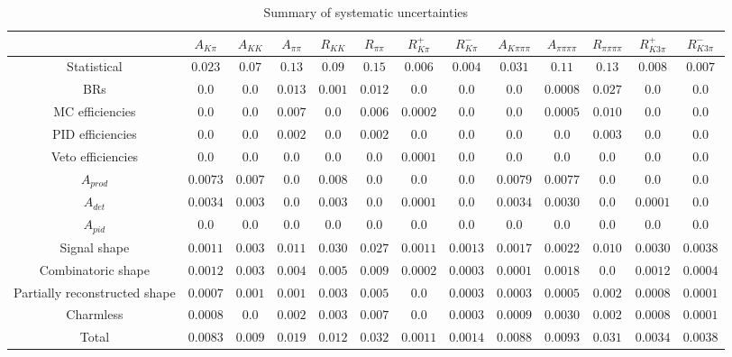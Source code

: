 \begin{table}
\centering
{\footnotesize
\begin{tabular}{ccccccccccccc}
\hline
& $A_{K\pi}$ & $A_{KK}$ & $A_{\pi\pi}$ & $R_{KK}$ & $R_{\pi\pi}$ & $R^+_{K\pi}$ & $R^-_{K\pi}$ & $A_{K\pi\pi\pi}$ & $A_{\pi\pi\pi\pi}$ & $R_{\pi\pi\pi\pi}$ & $R^+_{K3\pi}$ & $R^-_{K3\pi}$ \\
\hline
Statistical & $0.023$ & $0.07$ & $0.13$ & $0.09$ & $0.15$ & $0.006$ & $0.004$ & $0.031$ & $0.11$ & $0.13$ & $0.008$ & $0.007$ \\
\hline
BRs  & $0.0$ & $0.0$ & $0.013$ & $0.001$ & $0.012$ & $0.0$ & $0.0$ & $0.0$ & $0.0008$ & $0.027$ & $0.0$ & $0.0$ \\
MC efficiencies  & $0.0$ & $0.0$ & $0.007$ & $0.0$ & $0.006$ & $0.0002$ & $0.0$ & $0.0$ & $0.0005$ & $0.010$ & $0.0$ & $0.0$ \\
PID efficiencies  & $0.0$ & $0.0$ & $0.002$ & $0.0$ & $0.002$ & $0.0$ & $0.0$ & $0.0$ & $0.0$ & $0.003$ & $0.0$ & $0.0$ \\
Veto efficiencies  & $0.0$ & $0.0$ & $0.0$ & $0.0$ & $0.0$ & $0.0001$ & $0.0$ & $0.0$ & $0.0$ & $0.0$ & $0.0$ & $0.0$ \\
$A_{prod}$  & $0.0073$ & $0.007$ & $0.0$ & $0.008$ & $0.0$ & $0.0$ & $0.0$ & $0.0079$ & $0.0077$ & $0.0$ & $0.0$ & $0.0$ \\
$A_{det}$  & $0.0034$ & $0.003$ & $0.0$ & $0.003$ & $0.0$ & $0.0001$ & $0.0$ & $0.0034$ & $0.0030$ & $0.0$ & $0.0001$ & $0.0$ \\
$A_{pid}$ & $0.0$ & $0.0$ & $0.0$ & $0.0$ & $0.0$ & $0.0$ & $0.0$ & $0.0$ & $0.0$ & $0.0$ & $0.0$ & $0.0$ \\
Signal shape & $0.0011$ & $0.003$ & $0.011$ & $0.030$ & $0.027$ & $0.0011$ & $0.0013$ & $0.0017$ & $0.0022$ & $0.010$ & $0.0030$ & $0.0038$ \\
Combinatoric shape  & $0.0012$ & $0.003$ & $0.004$ & $0.005$ & $0.009$ & $0.0002$ & $0.0003$ & $0.0001$ & $0.0018$ & $0.0$ & $0.0012$ & $0.0004$ \\
Partially reconstructed shape  & $0.0007$ & $0.001$ & $0.001$ & $0.003$ & $0.005$ & $0.0$ & $0.0003$ & $0.0003$ & $0.0005$ & $0.002$ & $0.0008$ & $0.0001$ \\
Charmless  & $0.0008$ & $0.0$ & $0.002$ & $0.003$ & $0.007$ & $0.0$ & $0.0003$ & $0.0009$ & $0.0030$ & $0.002$ & $0.0008$ & $0.0001$ \\
\hline
Total & $0.0083$ & $0.009$ & $0.019$ & $0.012$ & $0.032$ & $0.0011$ & $0.0014$ & $0.0088$ & $0.0093$ & $0.031$ & $0.0034$ & $0.0038$ \\
\hline
\end{tabular}}
\caption{Summary of systematic uncertainties}
\label{systematics}
\end{table}


